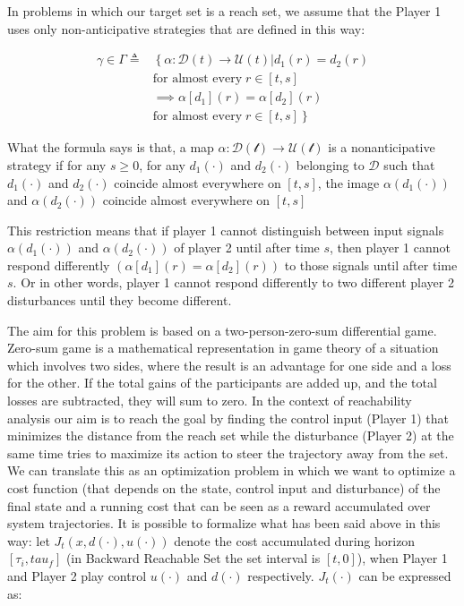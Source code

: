 In problems in which our target set is a reach set, we assume that the Player 1 uses only non-anticipative strategies that are defined in this way:


\begin{equation}
	\label{eq:non_ant_stra}
	\begin{split}
		\gamma \in \Gamma \triangleq 
		& \left\{ 
			\alpha : \mathcal{D}(t) \rightarrow \mathcal{U}(t) | d_1(r) = d_2(r) 
		\right. \\ 
		& \textrm{for almost every} \;r \in [t,s] \\
		& \implies \alpha[d_1](r)= \alpha[d_2](r) \\
		& \left. 
			\textrm{for almost every} \; r \in [t,s] 
		\right\}  
	\end{split}
\end{equation}

What the formula says is that, a map $\alpha : \mathcal{D(t)} \rightarrow \mathcal{U(t)}$ is a nonanticipative strategy if  for any $s \geq 0$, for any $d_1(\cdot)$ and $d_2(\cdot)$ belonging to $\mathcal{D}$ such that $d_1(\cdot)$ and $d_2(\cdot)$ coincide almost everywhere on $[t,s]$, the image $\alpha(d_1(\cdot))$ and $\alpha(d_2(\cdot))$ coincide almost everywhere on $[t,s]$

This restriction means that if player 1 cannot distinguish between input signals $ \alpha (d_1( \cdot )) $ and $ \alpha (d_2( \cdot ) )$ of player 2 until after time $s$, then player 1 cannot respond differently $( \alpha [d_1](r) = \alpha [ d_2 ](r))$ to those signals until after time $s$. Or in other words, player 1 cannot respond differently to two different player 2 disturbances until they become different.

The aim for this problem is based on a two-person-zero-sum differential game. Zero-sum game is a mathematical representation in game theory of a situation which involves two sides, where the result is an advantage for one side and a loss for the other. If the total gains of the participants are added up, and the total losses are subtracted, they will sum to zero.
In the context of reachability analysis our aim is to reach the goal by finding the control input (Player 1) that minimizes the distance from the reach set while the disturbance  (Player 2) at the same time tries to maximize its action to steer the trajectory away from the set. We can translate this as an optimization problem in which we want to optimize a cost function (that depends on the state, control input and disturbance) of the final state and a running cost that can be seen as a reward accumulated over system trajectories. 
It is possible to formalize what has been said above in this way: let $J_t(x,d(\cdot ),u(\cdot))$ denote the cost accumulated during horizon $[\tau_i ,tau_f ]$ (in Backward Reachable Set the set interval is $[t,0]$), when Player 1 and Player 2 play control $u(\cdot)$ and $d(\cdot)$ respectively. $J_t(\cdot)$ can be expressed as:

